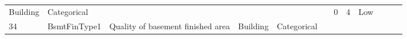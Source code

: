 \documentclass[11pt]{article}
\begin{document}
\begin{longtable}[]{@{}llllllllllll@{}}
\begin{minipage}[t]{0.04\columnwidth}
Building\strut
\end{minipage} & \begin{minipage}[t]{0.04\columnwidth}\raggedright\strut
Categorical\strut
\end{minipage} & \begin{minipage}[t]{0.04\columnwidth}\raggedright\strut
\strut
\end{minipage} & \begin{minipage}[t]{0.04\columnwidth}\raggedright\strut
\strut
\end{minipage} & \begin{minipage}[t]{0.04\columnwidth}\raggedright\strut
\strut
\end{minipage} & \begin{minipage}[t]{0.04\columnwidth}\raggedright\strut
\strut
\end{minipage} & \begin{minipage}[t]{0.04\columnwidth}\raggedright\strut
0\strut
\end{minipage} & \begin{minipage}[t]{0.04\columnwidth}\raggedright\strut
4\strut
\end{minipage} & \begin{minipage}[t]{0.04\columnwidth}\raggedright\strut
Low\strut
\end{minipage}\tabularnewline
\begin{minipage}[t]{0.04\columnwidth}\raggedright\strut
34\strut
\end{minipage} & \begin{minipage}[t]{0.04\columnwidth}\raggedright\strut
BsmtFinType1\strut
\end{minipage} & \begin{minipage}[t]{0.04\columnwidth}\raggedright\strut
Quality of basement finished area\strut
\end{minipage} & \begin{minipage}[t]{0.04\columnwidth}\raggedright\strut
Building\strut
\end{minipage} & \begin{minipage}[t]{0.04\columnwidth}\raggedright\strut
Categorical\strut
\end{minipage} & \begin{minipage}[t]{0.04\columnwidth}\raggedright\strut
\strut
\end{minipage} & \begin{minipage}[t]{0.04\columnwidth}\raggedright\strut
\strut
\end{minipage} & \begin{minipage}[t]{0.04\columnwidth}\raggedright\strut

\end{minipage}
\end{longtable}
\end{document}
